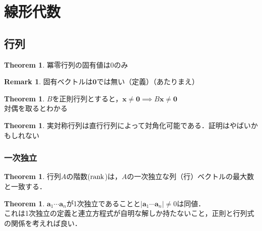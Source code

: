 \documentclass[a4j,uplatex]{jsarticle}
\theoremstyle{definition}
\newtheorem{thm}[dfn]{Theorem}
\newtheorem{rem}[dfn]{Remark}
\begin{document}
\section{線形代数}
\subsection{行列}

\begin{thm}
    冪零行列の固有値は$0$のみ
\end{thm}

\begin{rem}
    固有ベクトルは$\boldsymbol{0}$では無い（定義）（あたりまえ）
\end{rem}

\begin{thm}
    $B$を正則行列とすると，$\boldsymbol{x}\neq \boldsymbol{0} \implies B\boldsymbol{x}\neq \boldsymbol{0}$\\
    対偶を取るとわかる
\end{thm}

\begin{thm}
    実対称行列は直行行列によって対角化可能である．証明はやばいかもしれない
\end{thm}

\subsubsection{一次独立}
\begin{thm}
    行列$A$の階数($\rank$)は，$A$の一次独立な列（行）ベクトルの最大数と一致する．
\end{thm}

\begin{thm}
    $\boldsymbol{a}_1 \cdots \boldsymbol{a}_n$が1次独立であることと$|\boldsymbol{a}_1\cdots\boldsymbol{a}_n|\neq 0$は同値．\\
    これは1次独立の定義と連立方程式が自明な解しか持たないこと，正則と行列式の関係を考えれば良い．
\end{thm}
\end{document}
